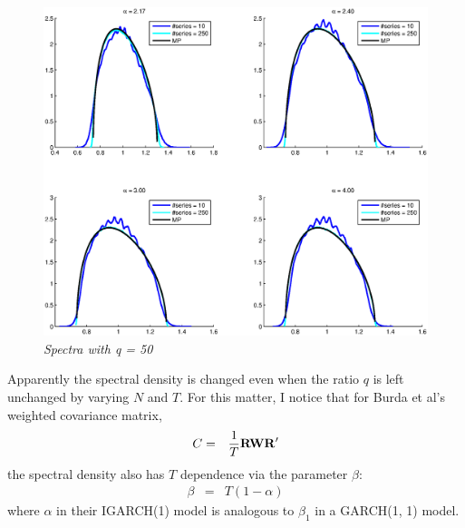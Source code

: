\documentclass{article}
\begin{document}
\begin{figure}[htb!]
  \centering
  \includegraphics[scale=0.3]{../pics/spectra_q50.eps}
  \caption{\small \it Spectra with q = 50}
\end{figure}

Apparently the spectral density is changed even when the ratio $q$ is left
unchanged by varying $N$ and $T$. For this matter, I notice that for
Burda et al's weighted covariance matrix,
\begin{eqnarray*}
  C &=& {1 \over T} \mathbf{RWR'}
\end{eqnarray*}
the spectral density also has $T$ dependence via the parameter $\beta$:
\begin{eqnarray*}
  \beta &=& T(1 - \alpha)
\end{eqnarray*}
where $\alpha$ in their IGARCH(1) model is analogous to $\beta_1$ in a
GARCH(1, 1) model.
\end{document}
